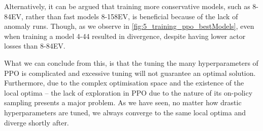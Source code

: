Alternatively, it can be argued that training more conservative models, such as 8-84EV, rather than fast models 8-158EV, is beneficial because of the lack of anomaly runs. Though, as we observe in \cref{fig:5_training_ppo_bestModels}, even when training a model 4-44 resulted in divergence, despite having lower actor losses than 8-84EV. 

What we can conclude from this, is that the tuning the many hyperparameters of PPO is complicated and excessive tuning will not guarantee an optimal solution. Furthermore, due to the complex optimisation space and the existence of the local optima -- the lack of exploration in PPO due to the nature of its on-policy sampling presents a major problem. As we have seen, no matter how drastic hyperparameters are tuned, we always converge to the same local optima and diverge shortly after.

